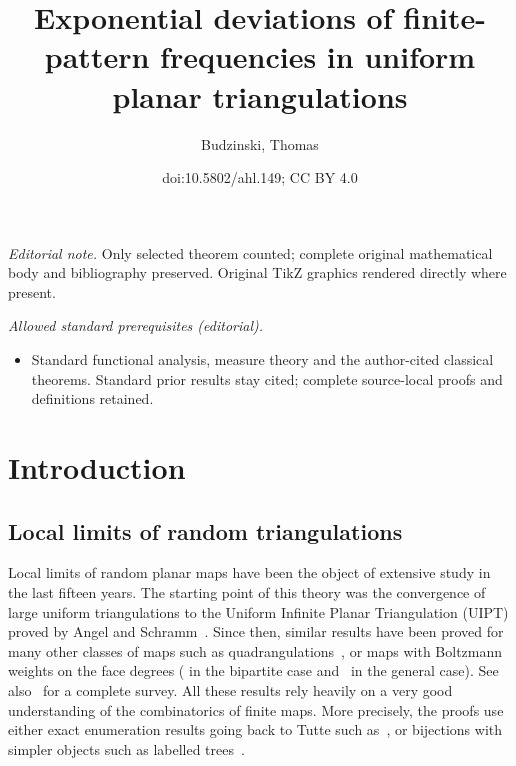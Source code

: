 \documentclass[10pt]{amsart}
\title{Exponential deviations of finite-pattern frequencies in uniform planar triangulations}
\author{Budzinski, Thomas}
\date{doi:10.5802/ahl.149; CC BY 4.0}
\theoremstyle{definition}\newtheorem{defi}[theo]{Definition}\newtheorem{rema}[theo]{Remark}\newtheorem{exam}[theo]{Example}\newtheorem{exem}[theo]{Example}\newtheorem{nota}[theo]{Notation}
\begin{document}
\maketitle
\noindent\textit{Editorial note.} Only selected theorem counted; complete original mathematical body and bibliography preserved. Original TikZ graphics rendered directly where present.\par\medskip
\noindent\textit{Allowed standard prerequisites (editorial).}\begin{itemize}
\item Standard functional analysis, measure theory and the author-cited classical theorems. Standard prior results stay cited; complete source-local proofs and definitions retained.
\end{itemize}\medskip

\section{Introduction}

\subsection*{Local limits of random triangulations}
Local limits of random planar maps have been the object of extensive study in the last fifteen years. The starting point of this theory was the convergence of large uniform triangulations to the Uniform Infinite Planar Triangulation (UIPT) proved by Angel and Schramm~\cite{AS03}. Since then, similar results have been proved for many other classes of maps such as quadrangulations~\cite{CD06}, or maps with Boltzmann weights on the face degrees (\cite{BS13} in the bipartite case and~\cite{St18} in the general case). See also~\cite{C-StFlour} for a complete survey. All these results rely heavily on a very good understanding of the combinatorics of finite maps. More precisely, the proofs use either exact enumeration results going back to Tutte such as~\cite{Tut62}, or bijections with simpler objects such as labelled trees~\cite{CV81}.
\end{document}
